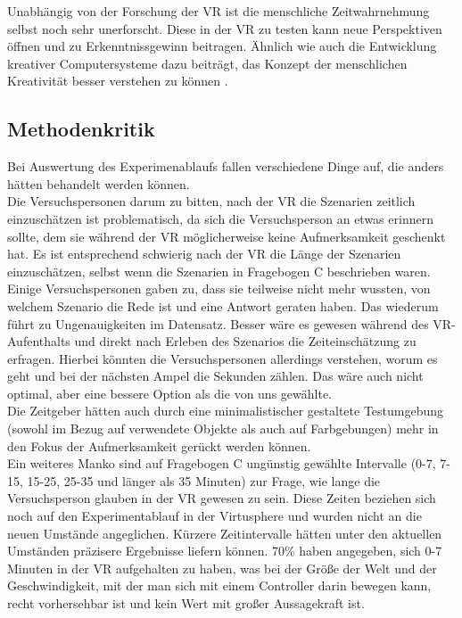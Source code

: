 \documentclass{Bericht}
\begin{document}
Unabhängig von der Forschung der VR ist die menschliche Zeitwahrnehmung selbst noch sehr unerforscht. Diese in der VR zu testen kann neue Perspektiven öffnen und zu Erkenntnissgewinn beitragen. Ähnlich wie auch die Entwicklung kreativer Computersysteme dazu beiträgt,  das Konzept der menschlichen Kreativität besser verstehen zu können \cite{comp}.


\label{subsec:kritik}
\subsection{Methodenkritik}
Bei Auswertung des Experimenablaufs fallen verschiedene Dinge auf, die anders hätten behandelt werden können.\\
Die Versuchspersonen darum zu bitten, nach der VR die Szenarien zeitlich einzuschätzen ist problematisch, da sich die Versuchsperson an etwas erinnern sollte, dem sie während der VR möglicherweise keine Aufmerksamkeit geschenkt hat.
 Es ist entsprechend schwierig nach der VR die Länge der Szenarien einzuschätzen, selbst wenn die Szenarien in Fragebogen C beschrieben waren. Einige Versuchspersonen gaben zu, dass sie teilweise nicht mehr wussten, von welchem Szenario die Rede ist und eine Antwort geraten haben. Das wiederum führt zu Ungenauigkeiten im Datensatz. 
 Besser wäre es gewesen während des VR-Aufenthalts und direkt nach Erleben des Szenarios die Zeiteinschätzung zu erfragen. Hierbei könnten die Versuchspersonen allerdings verstehen, worum es geht und bei der nächsten Ampel die Sekunden zählen. Das wäre auch nicht optimal, aber eine bessere Option als die von uns gewählte.\\
Die Zeitgeber hätten auch durch eine minimalistischer gestaltete Testumgebung (sowohl im Bezug auf verwendete Objekte als auch auf Farbgebungen) mehr in den Fokus der Aufmerksamkeit gerückt werden können.\\
Ein weiteres Manko sind auf Fragebogen C ungünstig gewählte Intervalle (0-7, 7-15, 15-25, 25-35 und länger als 35 Minuten) zur Frage, wie lange die Versuchsperson glauben in der VR gewesen zu sein. Diese Zeiten beziehen sich noch auf den Experimentablauf in der Virtusphere und wurden nicht an die neuen Umstände angeglichen. 
Kürzere Zeitintervalle hätten unter den aktuellen Umständen präzisere Ergebnisse liefern können. 70\% haben angegeben, sich 0-7 Minuten in der VR aufgehalten zu haben, was bei der Größe der Welt und der Geschwindigkeit, mit der man sich mit einem Controller darin bewegen kann, recht vorhersehbar ist und kein Wert mit großer Aussagekraft ist.\\
\end{document}
